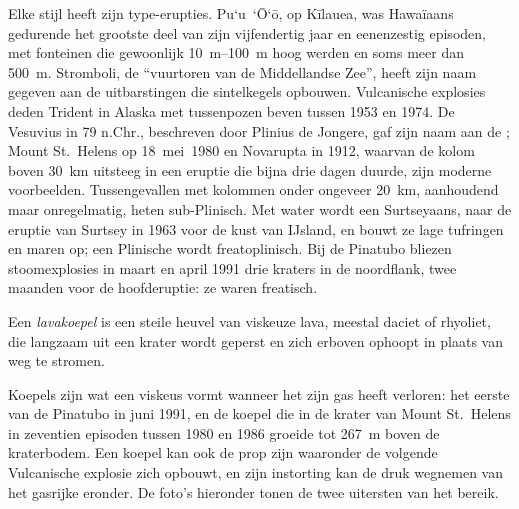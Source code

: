 Elke stijl heeft zijn type-erupties. Pu`u~`\=O`\=o, op Kīlauea, was Hawaïaans gedurende het grootste deel van
zijn vijfendertig jaar en eenenzestig episoden, met fonteinen die gewoonlijk
\qtyrange{10}{100}{m} hoog werden en soms meer dan \qty{500}{m}. Stromboli, de
``vuurtoren van de Middellandse Zee'', heeft zijn naam gegeven aan de uitbarstingen die
sintelkegels opbouwen. Vulcanische explosies deden Trident in Alaska met tussenpozen beven tussen
1953 en 1974. De Vesuvius in 79 n.Chr., beschreven door Plinius de Jongere, gaf zijn naam aan
de ; Mount St.~Helens op 18~mei~1980 en Novarupta in 1912, waarvan de
kolom boven \qty{30}{km} uitsteeg in een eruptie die bijna drie dagen duurde, zijn
moderne voorbeelden.
Tussengevallen met kolommen onder ongeveer \qty{20}{km}, aanhoudend maar onregelmatig,
heten sub-Plinisch. Met water wordt een  Surtseyaans,
naar de eruptie van Surtsey in 1963 voor de kust van IJsland, en bouwt ze lage
tufringen en maren op; een Plinische wordt freatoplinisch. Bij de Pinatubo bliezen
stoomexplosies in maart en april 1991 drie kraters in de noordflank, twee
maanden voor de hoofderuptie: ze waren freatisch.

\begin{definition}[Lavakoepel]\label{def:b2:eruptive-styles:dome}
Een \emph{lavakoepel} is een steile heuvel van viskeuze lava,
meestal daciet of rhyoliet, die langzaam uit een krater wordt geperst en zich erboven ophoopt
in plaats van weg te stromen.
\end{definition}

Koepels zijn wat een viskeus  vormt wanneer het zijn gas heeft verloren: het eerste
 van de Pinatubo in juni 1991, en de koepel die in de krater van Mount St.~Helens in
zeventien episoden tussen 1980 en 1986 groeide tot \qty{267}{m} boven de kraterbodem.
Een koepel kan ook de prop zijn waaronder de volgende Vulcanische explosie zich opbouwt,
en zijn instorting kan de druk wegnemen van het gasrijke  eronder. De
foto's hieronder tonen de twee uitersten van het bereik.

